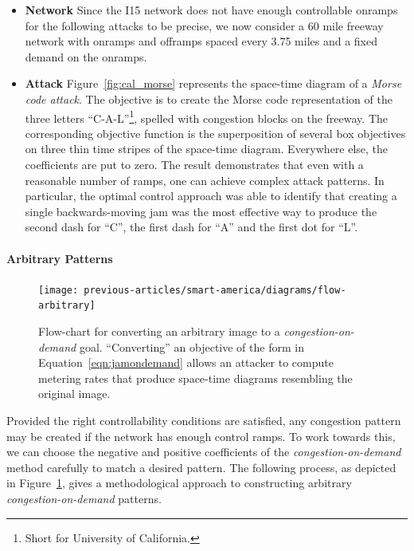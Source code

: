 \begin{itemize}
	\item \textbf{Network}
	Since the I15 network does not have enough controllable onramps for the following attacks to be precise, we now consider a 60 mile freeway network with onramps and offramps spaced every 3.75  miles and a fixed demand on the onramps.
	\item \textbf{Attack}
	Figure~\ref{fig:cal_morse} represents the space-time diagram of a \emph{Morse code attack}. The objective is to create the Morse code representation of the three letters ``C-A-L''\footnote{Short for University of California.}, spelled with congestion blocks on the freeway. The corresponding objective function is the superposition of several box objectives on three thin time stripes of the space-time diagram. Everywhere else, the coefficients are put to zero. The result demonstrates that even with a reasonable number of ramps, one can achieve complex attack patterns. In particular, the optimal control approach was able to identify that creating a single backwards-moving jam was the most effective way to produce the second dash for ``C'', the first dash for ``A'' and the first dot for ``L''.
\end{itemize}

\paragraph{Arbitrary Patterns}

\begin{figure}[htbp]
	\centering
	\texttt{[image: previous-articles/smart-america/diagrams/flow-arbitrary]}
	\caption[Flow-chart for converting an arbitrary image to a \emph{congestion-on-demand} goal.]{Flow-chart for converting an arbitrary image to a \emph{congestion-on-demand} goal. ``Converting'' an objective of the form in Equation~\ref{eqn:jamondemand} allows an attacker to compute metering rates that produce space-time diagrams resembling the original image.}
	\label{fig:flow-arbitrary}
\end{figure}

Provided the right controllability conditions are satisfied, any congestion pattern may be created if the network has enough control ramps. To work towards this, we can choose the negative and positive coefficients of the \emph{congestion-on-demand} method carefully to match a desired pattern. The following process, as depicted in Figure~\ref{fig:flow-arbitrary}, gives a methodological approach to constructing arbitrary \emph{congestion-on-demand} patterns.

